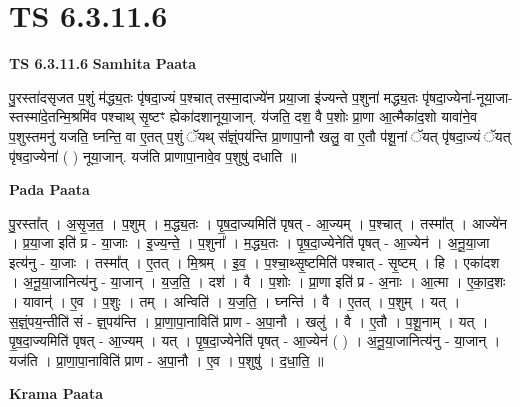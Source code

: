 \documentclass[17pt]{extarticle}
\begin{document}
\section{ TS 6.3.11.6 }

\textbf{TS 6.3.11.6 } \newline
\textbf{Samhita Paata} \newline

पु॒रस्ता॑दसृजत प॒शुं म॑द्ध्य॒तः पृ॑षदा॒ज्यं प॒श्चात् तस्मा॒दाज्ये॑न प्रया॒जा इ॑ज्यन्ते प॒शुना॑ मद्ध्य॒तः पृ॑षदा॒ज्येना॑-नूया॒जा-स्तस्मा॑दे॒तन्मि॒श्रमि॑व पश्चाथ् सृ॒ष्टꣳ ह्येका॑दशानूया॒जान्. य॑जति॒ दश॒ वै प॒शोः प्रा॒णा आ॒त्मैका॑द॒शो यावा॑ने॒व प॒शुस्तमनु॑ यजति॒ घ्नन्ति॒ वा ए॒तत् प॒शुं ॅयथ् स᳚ज्ञ्ं॒पय॑न्ति प्रा॒णापा॒नौ खलु॒ वा ए॒तौ प॑शू॒नां ॅयत् पृ॑षदा॒ज्यं ॅयत् पृ॑षदा॒ज्येना॑ ( ) नूया॒जान्. यज॑ति प्राणापा॒नावे॒व प॒शुषु॑ दधाति ॥ \newline

\textbf{Pada Paata} \newline

पु॒रस्ता᳚त् । अ॒सृ॒ज॒त॒ । प॒शुम् । म॒द्ध्य॒तः । पृ॒ष॒दा॒ज्यमिति॑ पृषत् - आ॒ज्यम् । प॒श्चात् । तस्मा᳚त् । आज्ये॑न । प्र॒या॒जा इति॑ प्र - या॒जाः । इ॒ज्य॒न्ते॒ । प॒शुना᳚ । म॒द्ध्य॒तः । पृ॒ष॒दा॒ज्येनेति॑ पृषत् - आ॒ज्येन॑ । अ॒नू॒या॒जा इत्य॑नु - या॒जाः । तस्मा᳚त् । ए॒तत् । मि॒श्रम् । इ॒व॒ । प॒श्चा॒थ्सृ॒ष्टमिति॑ पश्चात् - सृ॒ष्टम् । हि । एका॑दश । अ॒नू॒या॒जानित्य॑नु - या॒जान् । य॒ज॒ति॒ । दश॑ । वै । प॒शोः । प्रा॒णा इति॑ प्र - अ॒नाः । आ॒त्मा । ए॒का॒द॒शः । यावान्॑ । ए॒व । प॒शुः । तम् । अन्विति॑ । य॒ज॒ति॒ । घ्नन्ति॑ । वै । ए॒तत् । प॒शुम् । यत् । स॒ज्ञ्ं॒पय॒न्तीति॑ सं - ज्ञ्॒पय॑न्ति । प्रा॒णा॒पा॒नाविति॑ प्राण - अ॒पा॒नौ । खलु॑ । वै । ए॒तौ । प॒शू॒नाम् । यत् । पृ॒ष॒दा॒ज्यमिति॑ पृषत् - आ॒ज्यम् । यत् । पृ॒ष॒दा॒ज्येनेति॑ पृषत् - आ॒ज्येन॑ ( ) । अ॒नू॒या॒जानित्य॑नु - या॒जान् । यज॑ति । प्रा॒णा॒पा॒नाविति॑ प्राण - अ॒पा॒नौ । ए॒व । प॒शुषु॑ । द॒धा॒ति॒ ॥  \newline


\textbf{Krama Paata} \newline
\end{document}
